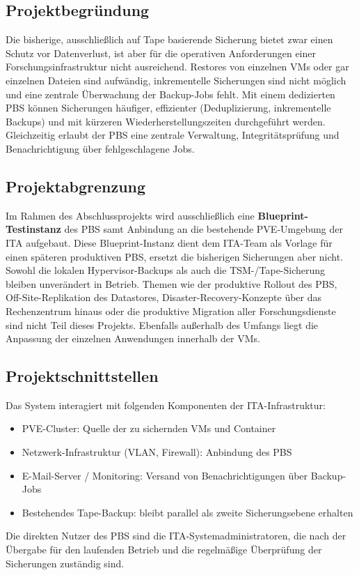 \subsection{Projektbegründung}
\label{sec:Projektbegruendung}
Die bisherige, ausschließlich auf Tape basierende Sicherung bietet zwar
einen Schutz vor Datenverlust, ist aber für die operativen Anforderungen
einer Forschungsinfrastruktur nicht ausreichend.
Restores von einzelnen \acp{VM} oder gar einzelnen Dateien sind aufwändig,
inkrementelle Sicherungen sind nicht möglich und eine zentrale Überwachung
der Backup-Jobs fehlt.
Mit einem dedizierten \acl{PBS} können Sicherungen häufiger,
effizienter (Deduplizierung, inkrementelle Backups) und mit
kürzeren Wiederherstellungszeiten durchgeführt werden.
Gleichzeitig erlaubt der \ac{PBS} eine zentrale Verwaltung,
Integritätsprüfung und Benachrichtigung über fehlgeschlagene Jobs.

\subsection{Projektabgrenzung}
\label{sec:Projektabgrenzung}
Im Rahmen des Abschlussprojekts wird ausschließlich eine
\textbf{Blueprint-Testinstanz} des \acl{PBS} samt Anbindung an die
bestehende \ac{PVE}-Umgebung der \ac{ITA} aufgebaut.
Diese Blueprint-Instanz dient dem \ac{ITA}-Team als Vorlage für
einen späteren produktiven \ac{PBS}, ersetzt die bisherigen
Sicherungen aber nicht. Sowohl die lokalen Hypervisor-Backups als
auch die \ac{TSM}-/Tape-Sicherung bleiben unverändert in Betrieb.
Themen wie der produktive Rollout des \ac{PBS}, Off-Site-Replikation
des Datastores, Disaster-Recovery-Konzepte über das Rechenzentrum
hinaus oder die produktive Migration aller Forschungsdienste sind
nicht Teil dieses Projekts.
Ebenfalls außerhalb des Umfangs liegt die Anpassung der einzelnen
Anwendungen innerhalb der \acp{VM}.

\subsection{Projektschnittstellen}
\label{sec:Projektschnittstellen}
Das System interagiert mit folgenden Komponenten der \ac{ITA}-Infrastruktur:
\begin{itemize}
    \item \acl{PVE}-Cluster: Quelle der zu sichernden \acp{VM} und Container
    \item Netzwerk-Infrastruktur (\ac{VLAN}, Firewall): Anbindung des \ac{PBS}
    \item E-Mail-Server / Monitoring: Versand von Benachrichtigungen über Backup-Jobs
    \item Bestehendes Tape-Backup: bleibt parallel als zweite Sicherungsebene erhalten
\end{itemize}
Die direkten Nutzer des \ac{PBS} sind die \ac{ITA}-Systemadministratoren,
die nach der Übergabe für den laufenden Betrieb und die regelmäßige
Überprüfung der Sicherungen zuständig sind.

